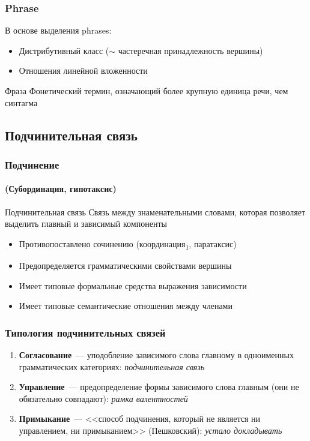 \begin{frame}
  \frametitle{Phrase}

  В основе выделения phrases: \begin{itemize}
    \item Дистрибутивный класс ($\sim$ частеречная принадлежность вершины)
    \item Отношения линейной вложенности
  \end{itemize}

  \vfill

  \begin{alertblock}{Фраза}
    Фонетический термин, означающий более крупную единица речи, чем синтагма
  \end{alertblock}
\end{frame}

\subsection{Подчинительная связь}

\begin{frame}
  \frametitle{Подчинение}
  \framesubtitle{(Субординация, гипотаксис)}

  \begin{alertblock}{Подчинительная связь}
    Связь между знаменательными словами, которая позволяет выделить главный и зависимый компоненты
  \end{alertblock}

  \vfill

  \begin{itemize}
    \item Противопоставлено сочинению (координация\textsubscript{1}, паратаксис)
    \item Предопределяется грамматическими свойствами вершины
    \item Имеет типовые формальные средства выражения зависимости
    \item Имеет типовые семантические отношения между членами
  \end{itemize}
\end{frame}

\begin{frame}
  \frametitle{Типология подчинительных связей}

  \begin{enumerate}
    \item \textbf{Согласование}~--- уподобление зависимого слова главному в одноименных грамматических категориях: \textit{подчинительная связь}
    \item \textbf{Управление}~--- предопределение формы зависимого слова главным (они не обязательно совпадают): \textit{рамка валентностей}
    \item \textbf{Примыкание}~--- <<способ подчинения, который не является ни управлением, ни примыканием>> (Пешковский): \textit{устало докладывать}
  \end{enumerate}
\end{frame}

